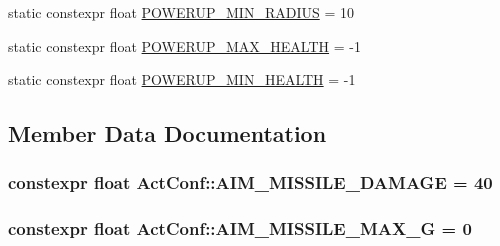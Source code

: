 \begin{DoxyCompactItemize}
\item 
static constexpr float \hyperlink{class_act_conf_a4bb7dd3592fa1dfdd2a39beb748fb929}{P\+O\+W\+E\+R\+U\+P\+\_\+\+M\+I\+N\+\_\+\+R\+A\+D\+I\+U\+S} = 10
\item 
static constexpr float \hyperlink{class_act_conf_acabfbbc2f54a2a6c249cfb5cc1afb2dc}{P\+O\+W\+E\+R\+U\+P\+\_\+\+M\+A\+X\+\_\+\+H\+E\+A\+L\+T\+H} = -\/1
\item 
static constexpr float \hyperlink{class_act_conf_a7faa696e27ff6cce008476fd6dcd6210}{P\+O\+W\+E\+R\+U\+P\+\_\+\+M\+I\+N\+\_\+\+H\+E\+A\+L\+T\+H} = -\/1
\end{DoxyCompactItemize}


\subsection{Member Data Documentation}
\hypertarget{class_act_conf_ab5b9504a164684a3184baa14ca2ff23f}{
\subsubsection[{A\+I\+M\+\_\+\+M\+I\+S\+S\+I\+L\+E\+\_\+\+D\+A\+M\+A\+G\+E}]{\setlength{\rightskip}{0pt plus 5cm}constexpr float Act\+Conf\+::\+A\+I\+M\+\_\+\+M\+I\+S\+S\+I\+L\+E\+\_\+\+D\+A\+M\+A\+G\+E = 40\hspace{0.3cm}{\ttfamily [static]}}}\label{class_act_conf_ab5b9504a164684a3184baa14ca2ff23f}
\hypertarget{class_act_conf_a5fc2b902e93d5fa994576d61c1da7d4b}{
\subsubsection[{A\+I\+M\+\_\+\+M\+I\+S\+S\+I\+L\+E\+\_\+\+M\+A\+X\+\_\+\+G}]{\setlength{\rightskip}{0pt plus 5cm}constexpr float Act\+Conf\+::\+A\+I\+M\+\_\+\+M\+I\+S\+S\+I\+L\+E\+\_\+\+M\+A\+X\+\_\+\+G = 0\hspace{0.3cm}{\ttfamily [static]}}}\label{class_act_conf_a5fc2b902e93d5fa994576d61c1da7d4b}
